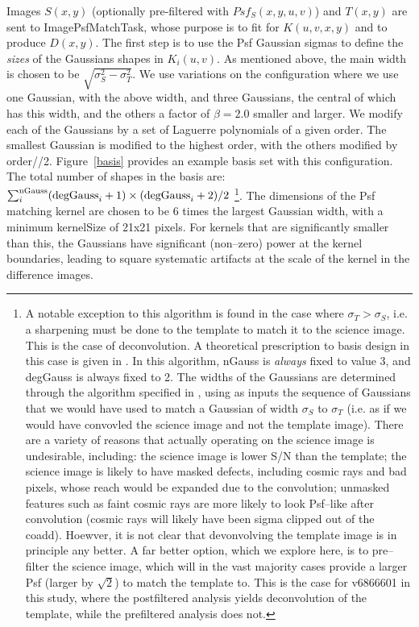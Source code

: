 \documentclass[prd, nofootinbib, floatfix, 11pt,tightenlines,times]{article}
\begin{document}
Images $S(x,y)$ (optionally pre-filtered with $Psf_S(x,y,u,v)$) and
$T(x,y)$ are sent to ImagePsfMatchTask, whose purpose is to fit for
$K(u,v,x,y)$ and to produce $D(x,y)$.  The first step is to use the
Psf Gaussian sigmas to define the {\it sizes} of the Gaussians shapes
in $K_i(u,v)$.  As mentioned above, the main width is chosen to be
$\sqrt{\sigma_S^2 - \sigma_T^2}$.  We use variations on the
configuration where we use one Gaussian, with the above width, and
three Gaussians, the central of which has this width, and the others a
factor of $\beta = 2.0$ smaller and larger.  We modify each of the
Gaussians by a set of Laguerre polynomials of a given order.  The
smallest Gaussian is modified to the highest order, with the others
modified by order//2.  Figure~\ref{basis} provides an example basis
set with this configuration.  The total number of shapes in the basis
are: $\sum_i^{\rm nGauss} ({\rm degGauss}_i+1)\times({\rm
  degGauss}_i+2)/2$ \footnote{ A notable exception to this algorithm
  is found in the case where $\sigma_T > \sigma_S$, i.e. a sharpening
  must be done to the template to match it to the science image.  This
  is the case of deconvolution.  A theoretical prescription to basis
  design in this case is given in \cite{0266-5611-26-8-085002}.  In
  this algorithm, nGauss is {\it always} fixed to value 3, and
  degGauss is always fixed to 2.  The widths of the Gaussians are
  determined through the algorithm specified in
  \cite{0266-5611-26-8-085002}, using as inputs the sequence of
  Gaussians that we would have used to match a Gaussian of width
  $\sigma_S$ to $\sigma_T$ (i.e. as if we would have convovled the
  science image and not the template image).  There are a variety of
  reasons that actually operating on the science image is undesirable,
  including: the science image is lower S/N than the template; the
  science image is likely to have masked defects, including cosmic
  rays and bad pixels, whose reach would be expanded due to the
  convolution; unmasked features such as faint cosmic rays are more
  likely to look Psf--like after convolution (cosmic rays will likely
  have been sigma clipped out of the coadd).  Hoewver, it is not clear
  that devonvolving the template image is in principle any better.  A
  far better option, which we explore here, is to pre--filter the
  science image, which will in the vast majority cases provide a
  larger Psf (larger by $\sqrt{2}$) to match the template to.  This is
  the case for v6866601 in this study, where the postfiltered analysis
  yields deconvolution of the template, while the prefiltered analysis
  does not.
}.
%
The dimensions of the Psf matching kernel are
chosen to be 6 times the largest Gaussian width, with a minimum
kernelSize of 21x21 pixels.  For kernels that are significantly
smaller than this, the Gaussians have significant (non--zero) power at
the kernel boundaries, leading to square systematic artifacts at the
scale of the kernel in the difference images.
\end{document}
